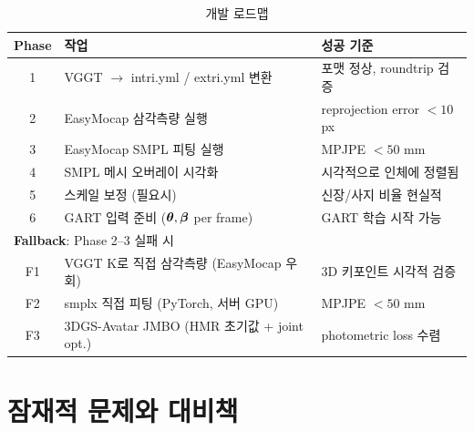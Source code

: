\documentclass[11pt, a4paper]{report}
\begin{document}
\begin{table}[H]
\centering
\caption{개발 로드맵}
\renewcommand{\arraystretch}{1.5}
\begin{tabular}{c p{7cm} p{4cm}}
\toprule
\textbf{Phase} & \textbf{작업} & \textbf{성공 기준} \\
\midrule
1 & VGGT $\rightarrow$ intri.yml / extri.yml 변환 & 포맷 정상, roundtrip 검증 \\
2 & EasyMocap 삼각측량 실행 & reprojection error $< 10$ px \\
3 & EasyMocap SMPL 피팅 실행 & MPJPE $< 50$ mm \\
4 & SMPL 메시 오버레이 시각화 & 시각적으로 인체에 정렬됨 \\
5 & 스케일 보정 (필요시) & 신장/사지 비율 현실적 \\
6 & GART 입력 준비 ($\bm{\theta}, \bm{\beta}$ per frame) & GART 학습 시작 가능 \\
\midrule
\multicolumn{3}{l}{\textbf{Fallback}: Phase 2--3 실패 시} \\
\midrule
F1 & VGGT K로 직접 삼각측량 (EasyMocap 우회) & 3D 키포인트 시각적 검증 \\
F2 & smplx 직접 피팅 (PyTorch, 서버 GPU) & MPJPE $< 50$ mm \\
F3 & 3DGS-Avatar JMBO (HMR 초기값 + joint opt.) & photometric loss 수렴 \\
\bottomrule
\end{tabular}
\end{table}


\section{잠재적 문제와 대비책}
\end{document}

